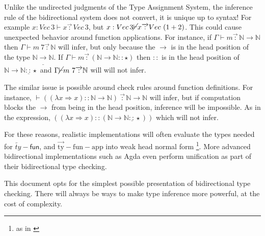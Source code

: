 Unlike the undirected judgments of the Type Assignment System, the inference rule of the bidirectional system does not convert, it is unique up to syntax! For example $x:Vec\,3\vdash x\overrightarrow{\,:\,}Vec\,3$, but $x:Vec\,3\cancel{\vdash}x\overrightarrow{\,:\,}Vec\,\left(1+2\right)$.
This could cause unexpected behavior around function applications.
For instance, if $\Gamma\vdash m\overrightarrow{\,:\,}\mathbb{N}\rightarrow\mathbb{N}$ then $\Gamma\vdash m\:7\overrightarrow{\,:\,}\mathbb{N}$ will infer, but only because the $\rightarrow$ is in the head position of the type $\mathbb{N}\underline{\rightarrow}\mathbb{N}$.
If $\Gamma\vdash m\overrightarrow{\,:\,}\left(\mathbb{N}\rightarrow\mathbb{N}::\star\right)$ then $::$ is in the head position of $\mathbb{N}\rightarrow\mathbb{N}\underline{::}\star$ and $\Gamma\cancel{\vdash}m\ 7\overrightarrow{\,:\,}\mathbb{N}$ will will not infer.

The similar issue is possible around check rules around function definitions.
For instance, $\vdash\left((\lambda x\Rightarrow x)::\mathbb{N}\rightarrow\mathbb{N}\right)\ \overrightarrow{\,:\,}\mathbb{N}\rightarrow\mathbb{N}$ will infer, but if computation blocks the $\rightarrow$ from being in the head position, inference will be impossible.
As in the expression, $\left((\lambda x\Rightarrow x)::\left(\mathbb{N}\rightarrow\mathbb{N}\underline{::}\star\right)\right)$ which will not infer.


For these reasons, realistic implementations will often evaluate the types needed for $\overleftarrow{ty}-\mathsf{fun}$, and $\operatorname{\overrightarrow{ty}-fun-app}$ into weak head normal form \footnote{as in \cite{COQUAND1996167}}.
More advanced bidirectional implementations such as Agda\cite{norell2007towards} even perform unification as part of their bidirectional type checking.





This document opts for the simplest possible presentation of bidirectional type checking.
There will always be ways to make type inference more powerful, at the cost of complexity.


